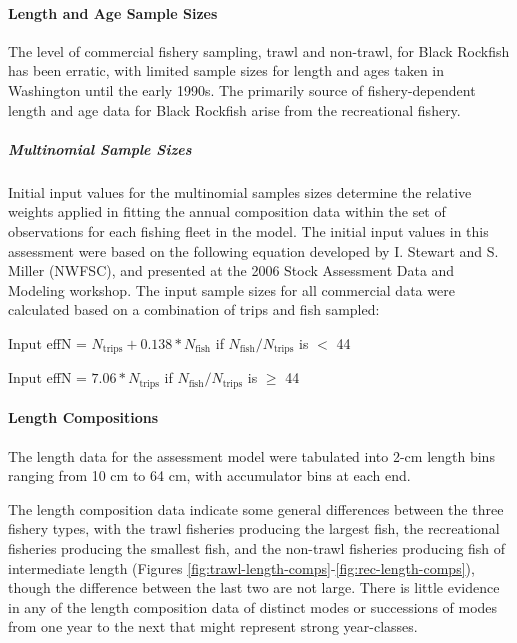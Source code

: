 \documentclass[11pt,
  english,
  letterpaper,
]{article}
\begin{document}
\hypertarget{length-and-age-sample-sizes}{%
\paragraph{Length and Age Sample Sizes}\label{length-and-age-sample-sizes}}

The level of commercial fishery sampling, trawl and non-trawl, for Black Rockfish has been erratic, with limited sample sizes for length and ages taken in Washington until the early 1990s. The primarily source of fishery-dependent length and age data for Black Rockfish arise from the recreational fishery.

\hypertarget{multinomial-sample-sizes}{%
\subparagraph{Multinomial Sample Sizes}\label{multinomial-sample-sizes}}

Initial input values for the multinomial samples sizes determine the relative weights applied in fitting the annual composition data within the set of observations for each fishing fleet in the model. The initial input values in this assessment were based on the following equation developed by I. Stewart and S. Miller (NWFSC), and presented at the 2006 Stock Assessment Data and Modeling workshop. The input sample sizes for all commercial data were calculated based on a combination of trips and fish sampled:

\begin{centering}

Input effN = $N_{\text{trips}} + 0.138 * N_{\text{fish}}$ if $N_{\text{fish}}/N_{\text{trips}}$ is $<$ 44

Input effN = $7.06 * N_{\text{trips}}$ if $N_{\text{fish}}/N_{\text{trips}}$ is $\geq$ 44

\end{centering}

\hypertarget{length-compositions}{%
\paragraph{Length Compositions}\label{length-compositions}}

The length data for the assessment model were tabulated into 2-cm length bins ranging from 10 cm to 64 cm, with accumulator bins at each end.

The length composition data indicate some general differences between the three fishery types, with the trawl fisheries producing the largest fish, the recreational fisheries producing the smallest fish, and the non-trawl fisheries producing fish of intermediate length (Figures \ref{fig:trawl-length-comps}-\ref{fig:rec-length-comps}), though the difference between the last two are not large. There is little evidence in any of the length composition data of distinct modes or successions of modes from one year to the next that might represent strong year-classes.
\end{document}
